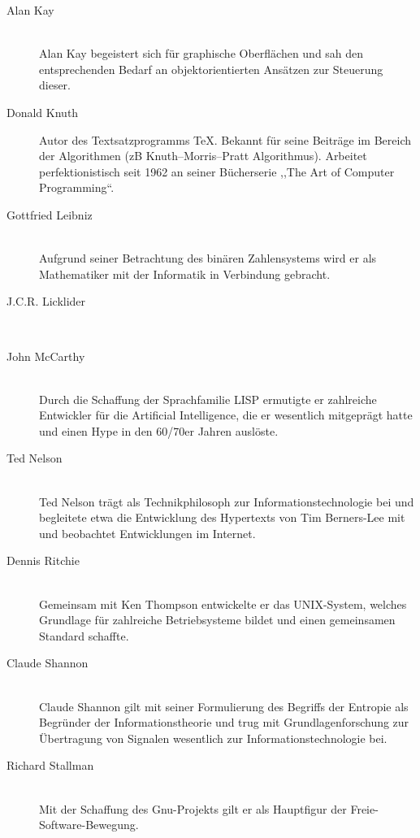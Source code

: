 \begin{description}
  \item[Alan Kay ] \hfill{} \\
    Alan Kay begeistert sich für graphische Oberflächen und sah den entsprechenden Bedarf an objektorientierten Ansätzen zur Steuerung dieser.

  \item[Donald Knuth ] \hfill{}
    Autor des Textsatzprogramms \TeX. Bekannt für seine Beiträge im Bereich der Algorithmen (zB Knuth–Morris–Pratt Algorithmus). Arbeitet perfektionistisch seit 1962 an seiner Bücherserie ,,The Art of Computer Programming``.

  \item[Gottfried Leibniz ] \hfill{} \\
    Aufgrund seiner Betrachtung des binären Zahlensystems wird er als Mathematiker mit der Informatik in Verbindung gebracht.

  \item[J.C.R. Licklider ] \hfill{} \\

  \item[John McCarthy ] \hfill{} \\
    Durch die Schaffung der Sprachfamilie LISP ermutigte er zahlreiche Entwickler für die Artificial Intelligence, die er wesentlich mitgeprägt hatte und einen Hype in den 60/70er Jahren auslöste.

  \item[Ted Nelson ] \hfill{} \\
    Ted Nelson trägt als Technikphilosoph zur Informationstechnologie bei und begleitete etwa die Entwicklung des Hypertexts von Tim Berners-Lee mit und beobachtet Entwicklungen im Internet.

  \item[Dennis Ritchie ] \hfill{} \\
   Gemeinsam mit Ken Thompson entwickelte er das UNIX-System, welches Grundlage für zahlreiche Betriebsysteme bildet und einen gemeinsamen Standard schaffte.

  \item[Claude Shannon ] \hfill{} \\
   Claude Shannon gilt mit seiner Formulierung des Begriffs der Entropie als Begründer der Informationstheorie und trug mit Grundlagenforschung zur Übertragung von Signalen wesentlich zur Informationstechnologie bei.

  \item[Richard Stallman ] \hfill{} \\
    Mit der Schaffung des Gnu-Projekts gilt er als Hauptfigur der Freie-Software-Bewegung.


\end{description}

